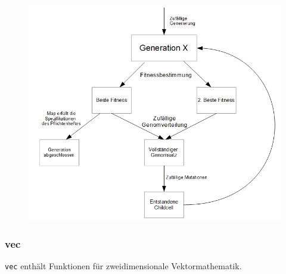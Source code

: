 \begin{figure}[H]
	\centering
	\includegraphics[width=1.1\textwidth]{Gen_Alg.png}
\end{figure}

\subsubsection{vec}
\verb+vec+ enthält Funktionen für zweidimensionale Vektormathematik.